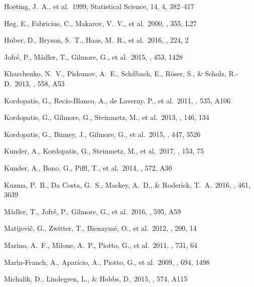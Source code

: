 \documentclass[preprint]{aastex61}
\begin{document}
\begin{thebibliography}{dummy}
 Hoeting, J.~A., et al.\ 1999, Statistical Science, 14, 4, 382--417

 H{\o}g, E., Fabricius, C., Makarov, V.~V., et al.\ 2000, \aap, 355, L27 

 Huber, D., Bryson, S.~T., Haas, M.~R., et al.\ 2016, \apjs, 224, 2 

 Jofr{\'e}, P., M{\"a}dler, T., Gilmore, G., et al.\ 2015, \mnras, 453, 1428 

 Kharchenko, N.~V., Piskunov, A.~E., Schilbach, E., R{\"o}ser, S., \& Scholz, R.-D.\ 2013, \aap, 558, A53 

 Kordopatis, G., Recio-Blanco, A., de Laverny, P., et al.\ 2011, \aap, 535, A106 

 Kordopatis, G., Gilmore, G., Steinmetz, M., et al.\ 2013, \aj, 146, 134 

 Kordopatis, G., Binney, J., Gilmore, G., et al.\ 2015, \mnras, 447, 3526 

 Kunder, A., Kordopatis, G., Steinmetz, M., et al.\ 2017, \aj, 153, 75 

 Kunder, A., Bono, G., Piffl, T., et al.\ 2014, \aap, 572, A30 

 Kuzma, P.~B., Da Costa, G.~S., Mackey, A.~D., \& Roderick, T.~A.\ 2016, \mnras, 461, 3639 

 M{\"a}dler, T., Jofr{\'e}, P., Gilmore, G., et al.\ 2016, \aap, 595, A59 


 Matijevi{\v c}, G., Zwitter, T., Bienaym{\'e}, O., et al.\ 2012, \apjs, 200, 14 

 Marino, A.~F., Milone, A.~P., Piotto, G., et al.\ 2011, \apj, 731, 64 

 Mar{\'{\i}}n-Franch, A., Aparicio, A., Piotto, G., et al.\ 2009, \apj, 694, 1498 

 Michalik, D., Lindegren, L., \& Hobbs, D.\ 2015, \aap, 574, A115 


\end{thebibliography}
\end{document}
